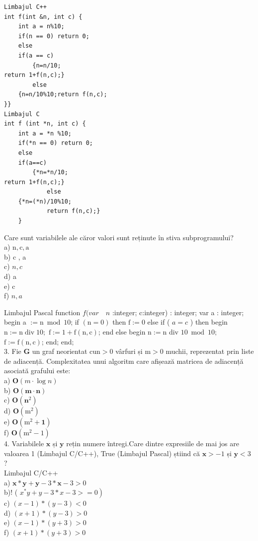 \documentclass[10pt]{article}
\begin{document}
\begin{verbatim}
Limbajul C++
int f(int &n, int c) {
    int a = n%10;
    if(n == 0) return 0;
    else
    if(a == c)
        {n=n/10;
return 1+f(n,c);}
        else
    {n=n/10%10;return f(n,c);
}}
Limbajul C
int f (int *n, int c) {
    int a = *n %10;
    if(*n == 0) return 0;
    else
    if(a==c)
        {*n=*n/10;
return 1+f(n,c);}
            else
    {*n=(*n)/10%10;
            return f(n,c);}
    }
\end{verbatim}

Care sunt variabilele ale căror valori sunt reținute în stiva subprogramului?\\
a) $\mathrm{n}, \mathrm{c}, \mathrm{a}$\\
b) c , a\\
c) $n, c$\\
d) a\\
e) c\\
f) $n, a$

Limbajul Pascal function $f(v a r \quad n$ :integer; c:integer) : integer; var a : integer; begin a $:=\mathrm{n} \bmod 10$; if $(\mathrm{n}=0)$ then $\mathrm{f}:=0$ else if ( $a=c$ ) then begin $\mathrm{n}:=\mathrm{n} \operatorname{div} 10 ;$ $\mathrm{f}:=1+\mathrm{f}(\mathrm{n}, \mathrm{c})$; end else begin $\mathrm{n}:=\mathrm{n}$ div $10 \bmod 10 ;$ $\mathrm{f}:=\mathrm{f}(\mathrm{n}, \mathrm{c})$; end; end;\\
3. Fie $\mathbf{G}$ un graf neorientat $\mathrm{cu} \mathrm{n}>0$ vârfuri și $\mathrm{m}>0$ muchii, reprezentat prin liste de adiacență. Complexitatea unui algoritm care afișează matricea de adiacență asociată grafului este:\\
a) $\mathbf{O}(m \cdot \log n)$\\
b) $\mathbf{O}(\mathbf{m} \cdot \mathbf{n})$\\
c) $\mathbf{O}\left(\mathbf{n}^{2}\right)$\\
d) $\mathbf{O}\left(\mathrm{m}^{2}\right)$\\
e) $\mathbf{O}\left(\mathrm{m}^{2}+\mathbf{1}\right)$\\
f) $\mathbf{O}\left(\mathrm{m}^{2}-1\right)$\\
4. Variabilele $\mathbf{x}$ și $\mathbf{y}$ rețin numere întregi.Care dintre expresiile de mai jos are valoarea 1 (Limbajul C/C++), True (Limbajul Pascal) știind că $\mathbf{x}>-1$ și $\mathbf{y}<3$ ?\\
Limbajul C/C++\\
a) $\mathbf{x *} \mathbf{y}+\mathbf{y}-3 * \mathbf{x}-3>0$\\
b)! ( $\left.x^{*} y+y-3 * x-3>=0\right)$\\
c) $(x-1) *(y-3)<0$\\
d) $(x+1) *(y-3)>0$\\
e) $(x-1) *(y+3)>0$\\
f) $(x+1) *(y+3)>0$
\end{document}
